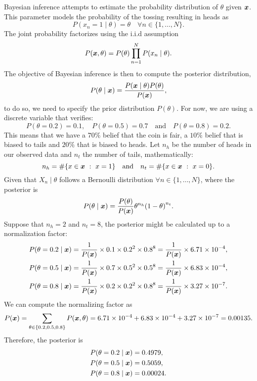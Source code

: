 Bayesian inference attempts to estimate the probability distribution of \(\theta\) given \(\bm{x}\). This parameter models the probability of the tossing resulting in heads as
\[
P(x_n = 1  \mid  \theta) = \theta \quad \forall n \in \{1,\dots,N\}.
\]
The joint probability factorizes using the i.i.d assumption
\[
  P(\bm{x},\theta) = P(\theta)\prod_{n=1}^N P(x_n \mid \theta).
\]
The objective of Bayesian inference is then to compute the posterior distribution,
\[
  P(\theta \mid \bm{x}) = \frac{P(\bm{x} \mid \theta)P(\theta)}{P(\bm{x})},
\]
to do so, we need to specify the prior distribution \(P(\theta)\). For now, we are using a discrete variable that verifies:
\[
  P(\theta = 0.2) = 0.1, \quad P(\theta = 0.5) = 0.7 \quad \text{and} \quad P(\theta = 0.8) = 0.2.
\]
This means that we have a \(70\%\) belief that the coin is fair, a \(10\%\)
belief that is biased to tails and \(20\%\) that is biased to heads. Let \(n_h\) be the number of heads in our observed data and \(n_t\)
the number of tails, mathematically:
\[
  n_{h} = \#\{x \in \bm{x} \ : \ x = 1\} \quad \text{and} \quad n_{t} = \#\{x \in \bm{x} \ : \ x = 0\}.
\]
Given that \(X_{n} \mid \theta\) follows a Bernoulli distribution \(\forall n \in \{1,\dots,N\}\), where the posterior is
\[
  P(\theta  \mid \bm{x}) = \frac{P(\theta)}{P(\bm{x})} \theta^{n_h}{(1-\theta)}^{n_t}.
\]
Suppose that \(n_h = 2\) and \(n_t = 8\), the posterior might be calculated up to a normalization factor:
\[
\begin{aligned}
  P(\theta = 0.2  \mid  \bm{x}) &= \frac{1}{P(\bm{x})}\times 0.1 \times 0.2^{2}
  \times 0.8^{8} = \frac{1}{P(\bm{x})} \times 6.71\times10^{-4}, \\
   P(\theta = 0.5  \mid  \bm{x}) &= \frac{1}{P(\bm{x})}\times 0.7 \times 0.5^{2}
   \times 0.5^{8} = \frac{1}{P(\bm{x})} \times 6.83\times10^{-4},\\
    P(\theta = 0.8  \mid  \bm{x}) &= \frac{1}{P(\bm{x})}\times 0.2 \times 0.2^{2}
  \times 0.8^{8} = \frac{1}{P(\bm{x})} \times 3.27\times10^{-7}.
\end{aligned}
\]
We can compute the normalizing factor as
\[
   P(\bm{x}) = \sum_{\theta \in \{0.2, 0.5, 0.8\}} P(\bm{x}, \theta) =   6.71\times10^{-4} +   6.83\times10^{-4} +
   3.27\times10^{-7} = 0.00135.
 \]
Therefore, the posterior is
\[
\begin{aligned}
  P(\theta = 0.2  \mid  \bm{x}) &= 0.4979,\\
  P(\theta = 0.5  \mid  \bm{x}) &= 0.5059,\\
  P(\theta = 0.8  \mid  \bm{x}) &= 0.00024.
\end{aligned}
\]

